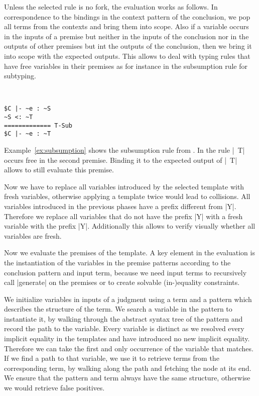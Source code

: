 Unless the selected rule is no fork, the evaluation works as
follows. In correspondence to the bindings in the context pattern of
the conclusion, we pop all terms from the contexts and bring them into
scope. Also if a variable occurs in the inputs of a premise but
neither in the inputs of the conclusion nor in the outputs of other
premises but int the outputs of the conclusion, then we bring it into
scope with the expected outputs.  This
allows to deal with typing rules that have free variables in their
premises as for instance in the subsumption rule for subtyping.

\begin{example}{~}
\begin{lstlisting}[language=sltc]
$C |- ~e : ~S
~S <: ~T
============= T-Sub
$C |- ~e : ~T
\end{lstlisting}
\label{ex:subsumption}
\end{example}

Example~\ref{ex:subsumption} shows the subsumption rule from
. In the rule \code|~T| occurs free in the second
premise. Binding it to the expected output of \code|~T| allows to
still evaluate this premise.

Now we have to replace all variables introduced by the selected
template with fresh variables, otherwise applying a template twice
would lead to collisions. All variables introduced in the previous
phases have a prefix different from \code|Y|. Therefore we replace all
variables that do not have the prefix \code|Y| with a fresh variable
with the prefix \code|Y|. Additionally this allows to verify visually
whether all variables are fresh.

Now we evaluate the premises of the template. A key element in the
evaluation is the instantiation of the variables in the premise
patterns according to the conclusion pattern and input term, because
we need input terms to recursively call \code|generate| on the
premises or to create solvable (in-)equality
constraints. 

We initialize variables in inputs of a judgment using a term and a
pattern which describes the structure of the term. We search a
variable in the pattern to instantiate it, by walking through the
abstract syntax tree of the pattern and record the path to the
variable. Every variable is distinct as we resolved every implicit
equality in the templates and have introduced no new implicit
equality. Therefore we can take the first and only occurrence of the
variable that matches. If we find a path to that variable, we use it
to retrieve terms from the corresponding term, by walking along the
path and fetching the node at its end. We ensure that the pattern and
term always have the same structure, otherwise we would retrieve false
positives.

